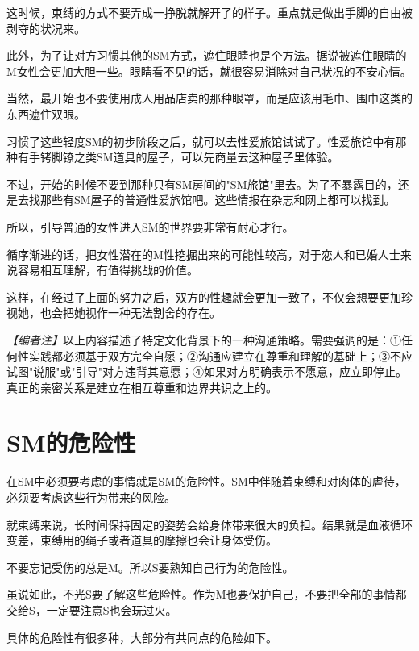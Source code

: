 \documentclass[12pt,UTF8]{ctexbook}
\begin{document}
这时候，束缚的方式不要弄成一挣脱就解开了的样子。重点就是做出手脚的自由被剥夺的状况来。

此外，为了让对方习惯其他的SM方式，遮住眼睛也是个方法。据说被遮住眼睛的M女性会更加大胆一些。眼睛看不见的话，就很容易消除对自己状况的不安心情。

当然，最开始也不要使用成人用品店卖的那种眼罩，而是应该用毛巾、围巾这类的东西遮住双眼。

习惯了这些轻度SM的初步阶段之后，就可以去性爱旅馆试试了。性爱旅馆中有那种有手铐脚镣之类SM道具的屋子，可以先商量去这种屋子里体验。

不过，开始的时候不要到那种只有SM房间的"SM旅馆"里去。为了不暴露目的，还是去找那些有SM屋子的普通性爱旅馆吧。这些情报在杂志和网上都可以找到。

所以，引导普通的女性进入SM的世界要非常有耐心才行。

循序渐进的话，把女性潜在的M性挖掘出来的可能性较高，对于恋人和已婚人士来说容易相互理解，有值得挑战的价值。

这样，在经过了上面的努力之后，双方的性趣就会更加一致了，不仅会想要更加珍视她，也会把她视作一种无法割舍的存在。

\textit{【编者注】}以上内容描述了特定文化背景下的一种沟通策略。需要强调的是：①任何性实践都必须基于双方完全自愿；②沟通应建立在尊重和理解的基础上；③不应试图"说服"或"引导"对方违背其意愿；④如果对方明确表示不愿意，应立即停止。真正的亲密关系是建立在相互尊重和边界共识之上的。

\section{SM的危险性}

在SM中必须要考虑的事情就是SM的危险性。SM中伴随着束缚和对肉体的虐待，必须要考虑这些行为带来的风险。

就束缚来说，长时间保持固定的姿势会给身体带来很大的负担。结果就是血液循环变差，束缚用的绳子或者道具的摩擦也会让身体受伤。

不要忘记受伤的总是M。所以S要熟知自己行为的危险性。

虽说如此，不光S要了解这些危险性。作为M也要保护自己，不要把全部的事情都交给S，一定要注意S也会玩过火。

具体的危险性有很多种，大部分有共同点的危险如下。
\end{document}

